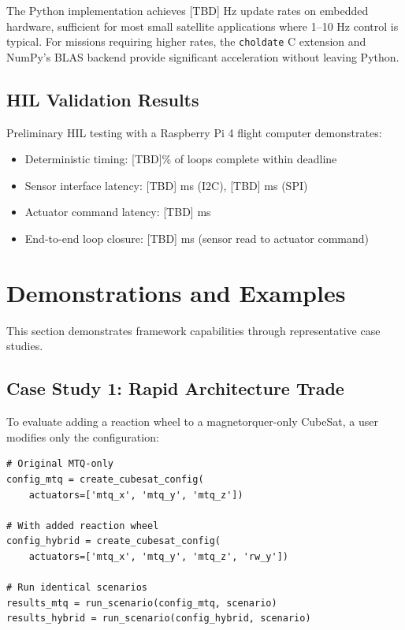\documentclass[conference]{IEEEtran}
\begin{document}
The Python implementation achieves [TBD] Hz update rates on embedded hardware, sufficient for most small satellite applications where 1--10 Hz control is typical. For missions requiring higher rates, the \texttt{choldate} C extension and NumPy's BLAS backend provide significant acceleration without leaving Python.


\subsection{HIL Validation Results}\label{subsec:hil_results}

Preliminary HIL testing with a Raspberry Pi 4 flight computer demonstrates:

\begin{itemize}
    \item Deterministic timing: [TBD]\% of loops complete within deadline
    \item Sensor interface latency: [TBD] ms (I2C), [TBD] ms (SPI)
    \item Actuator command latency: [TBD] ms
    \item End-to-end loop closure: [TBD] ms (sensor read to actuator command)
\end{itemize}



\section{Demonstrations and Examples}\label{sec:examples}

This section demonstrates framework capabilities through representative case studies.

\subsection{Case Study 1: Rapid Architecture Trade}\label{subsec:case1}

To evaluate adding a reaction wheel to a magnetorquer-only CubeSat, a user modifies only the configuration:

\begin{lstlisting}[caption={Adding reaction wheel to configuration}]
# Original MTQ-only
config_mtq = create_cubesat_config(
    actuators=['mtq_x', 'mtq_y', 'mtq_z'])

# With added reaction wheel
config_hybrid = create_cubesat_config(
    actuators=['mtq_x', 'mtq_y', 'mtq_z', 'rw_y'])

# Run identical scenarios
results_mtq = run_scenario(config_mtq, scenario)
results_hybrid = run_scenario(config_hybrid, scenario)
\end{lstlisting}
\end{document}
